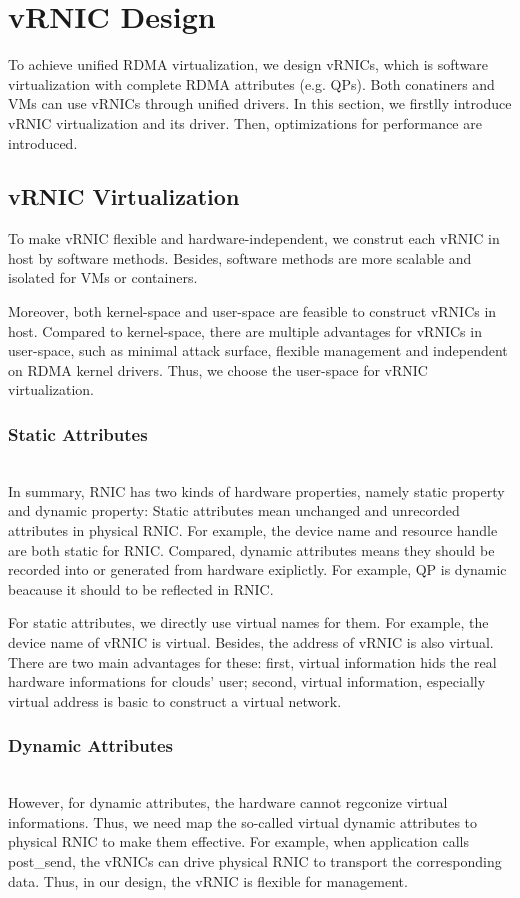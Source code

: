 \section{vRNIC Design}
To achieve unified RDMA virtualization, we design vRNICs, which is software virtualization with complete RDMA attributes (e.g. QPs). Both conatiners and VMs can use vRNICs through unified drivers. In this section, we firstlly introduce vRNIC virtualization and its driver. Then, optimizations for performance are introduced.

\subsection{vRNIC Virtualization}
To make vRNIC flexible and hardware-independent, we construt each vRNIC in host by software methods. Besides, software methods are more scalable and isolated for VMs or containers.

Moreover, both kernel-space and user-space are feasible to construct vRNICs in host. Compared to kernel-space, there are multiple advantages for vRNICs in user-space, such as minimal attack surface, flexible management and independent on RDMA kernel drivers. Thus, we choose the user-space for vRNIC virtualization.

\subsubsection{Static Attributes} ~\\
In summary, RNIC has two kinds of hardware properties, namely static property and dynamic property: Static attributes mean unchanged and unrecorded attributes in physical RNIC. For example, the device name and resource handle are both static for RNIC. Compared, dynamic attributes means they should be recorded into or generated from hardware exiplictly. For example, QP is dynamic beacause it should to be reflected in RNIC.

For static attributes, we directly use virtual names for them. For example, the device name of vRNIC is virtual. Besides, the address of vRNIC is also virtual. There are two main advantages for these: first, virtual information hids the real hardware informations for clouds' user; second, virtual information, especially virtual address is basic to construct a virtual network. 
\subsubsection{Dynamic Attributes} ~\\
However, for dynamic attributes, the hardware cannot regconize virtual informations. Thus, we need map the so-called virtual dynamic attributes to physical RNIC to make them effective. For example, when application calls post\_send, the vRNICs can drive physical RNIC to transport the corresponding data. Thus, in our design, the vRNIC is flexible for management. 

